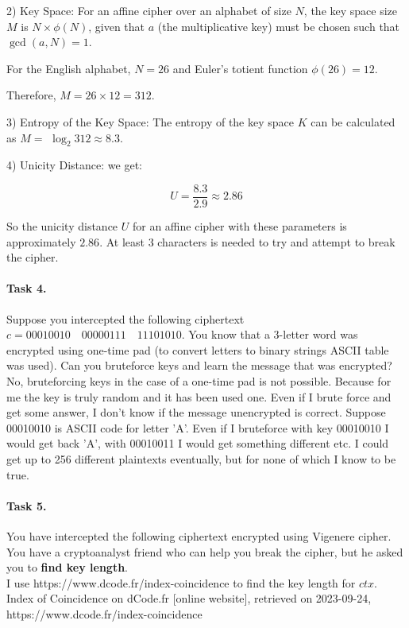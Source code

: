 \documentclass{article}
\begin{document}
2) Key Space:
For an affine cipher over an alphabet of size \( N \), the key space size \( M \) is \( N \times \phi(N) \), given that \( a \) (the multiplicative key) must be chosen such that \( \gcd(a, N) = 1 \).

For the English alphabet, \( N = 26 \) and Euler's totient function \( \phi(26) = 12 \).

Therefore, \( M = 26 \times 12 = 312 \).

3) Entropy of the Key Space:
The entropy of the key space \( K \) can be calculated as $M=$ \( \log_2 312 \approx 8.3 \).

4) Unicity Distance:
we get:

\[
  U = \frac{8.3}{2.9} \approx 2.86
\]

So the unicity distance \( U \) for an affine cipher with these parameters is approximately \(2.86\).
At least 3 characters is needed to try and attempt to break the cipher.


\paragraph{Task 4.} Suppose you intercepted the following ciphertext $c = 00010010 \quad 00000111 \quad 11101010$. You know that a
3-letter word was encrypted using one-time pad (to convert letters to binary strings ASCII table was used). Can you bruteforce keys and
learn the message that was encrypted?\\

No, bruteforcing keys in the case of a one-time pad is not possible. Because for me the key is truly random and it has been used one.
Even if I brute force and get some answer, I don't know if the message unencrypted is correct. Suppose 00010010 is ASCII code for letter
'A'. Even if I bruteforce with key 00010010 I would get back 'A', with 00010011 I would get something different etc. I could get up to 256
different plaintexts eventually, but for none of which I know to be true.



\paragraph{Task 5.}
You have intercepted the following ciphertext encrypted using Vigenere cipher. You have a cryptoanalyst friend who can help you break the cipher, but he asked you to \textbf{find key length}. \\

I use https://www.dcode.fr/index-coincidence to find the key length for $ctx$. Index of Coincidence on dCode.fr [online website], retrieved on 2023-09-24, https://www.dcode.fr/index-coincidence
\end{document}
